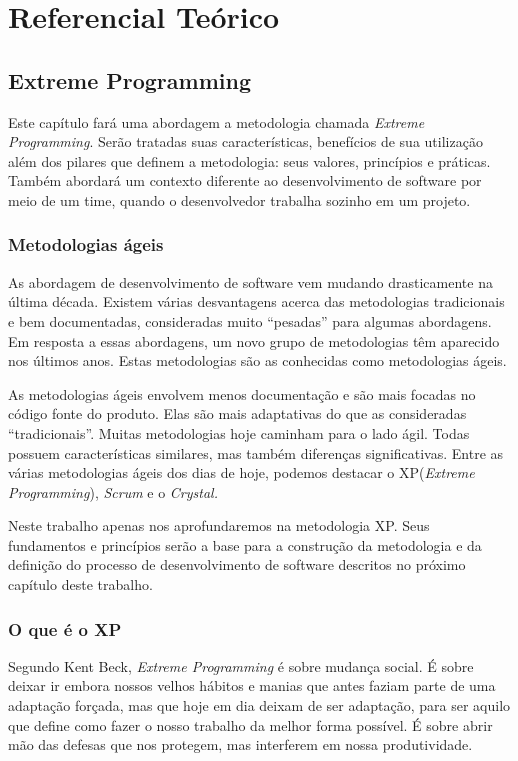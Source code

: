 \part{Referencial Teórico}

\chapter[Extreme Programming]{Extreme Programming}

Este capítulo fará uma abordagem a metodologia chamada \textit{Extreme Programming}. Serão tratadas suas características, benefícios de sua utilização além dos pilares que definem a metodologia: seus valores, princípios e práticas.
Também abordará um contexto diferente ao desenvolvimento de software por meio de um time, quando o desenvolvedor trabalha sozinho em um projeto.

\section{Metodologias ágeis}

As abordagem de desenvolvimento de software vem mudando drasticamente na última década. Existem várias desvantagens acerca das metodologias tradicionais e bem documentadas, consideradas muito “pesadas” para algumas abordagens. Em resposta a essas abordagens, um novo grupo de metodologias têm aparecido nos últimos anos. Estas metodologias são as conhecidas como metodologias ágeis. \cite{Agarwal:2008}

As metodologias ágeis envolvem menos documentação e são mais focadas no código fonte do produto. Elas são mais adaptativas do que as consideradas “tradicionais”. Muitas metodologias hoje caminham para o lado ágil. Todas possuem características similares, mas também diferenças significativas. Entre as várias metodologias ágeis dos dias de hoje, podemos destacar o XP(\textit{Extreme Programming}), \textit{Scrum} e o \textit{Crystal.} \cite{Agarwal:2008}

Neste trabalho apenas nos aprofundaremos na metodologia XP. Seus fundamentos e princípios serão a base para a construção da metodologia e da definição do processo de desenvolvimento de software descritos no próximo capítulo deste trabalho.

\section{O que é o XP}

Segundo Kent Beck, \cite{Beck:2004} \textit{Extreme Programming} é sobre mudança social. É sobre deixar ir embora nossos velhos hábitos e manias que antes faziam parte de uma adaptação forçada, mas que hoje em dia deixam de ser adaptação, para ser aquilo que define como fazer o nosso trabalho da melhor forma possível. É sobre abrir mão das defesas que nos protegem, mas interferem em nossa produtividade.

